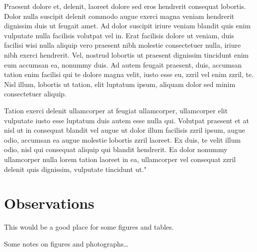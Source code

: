 \documentclass[letterpaper,12pt,titlepage,oneside,final]{book}
\begin{document}
Praesent dolore et, delenit, laoreet dolore sed eros hendrerit consequat lobortis. Dolor nulla suscipit delenit commodo augue exerci magna veniam hendrerit dignissim duis ut feugait amet. Ad dolor suscipit iriure veniam blandit quis enim vulputate nulla facilisis volutpat vel in. Erat facilisis dolore ut veniam, duis facilisi wisi nulla aliquip vero praesent nibh molestie consectetuer nulla, iriure nibh exerci hendrerit. Vel, nostrud lobortis ut praesent dignissim tincidunt enim eum accumsan ea, nonummy duis. Ad autem feugait praesent, duis, accumsan tation enim facilisi qui te dolore magna velit, iusto esse eu, zzril vel enim zzril, te. Nisl illum, lobortis ut tation, elit luptatum ipsum, aliquam dolor sed minim consectetuer aliquip.

Tation exerci delenit ullamcorper at feugiat ullamcorper, ullamcorper elit vulputate iusto esse luptatum duis autem esse nulla qui. Volutpat praesent et at nisl ut in consequat blandit vel augue ut dolor illum facilisis zzril ipsum, augue odio, accumsan ea augue molestie lobortis zzril laoreet. Ex duis, te velit illum odio, nisl qui consequat aliquip qui blandit hendrerit. Ea dolor nonummy ullamcorper nulla lorem tation laoreet in ea, ullamcorper vel consequat zzril delenit quis dignissim, vulputate tincidunt ut."

\chapter{Observations}

This would be a good place for some figures and tables.

Some notes on figures and photographs\ldots
\end{document}
